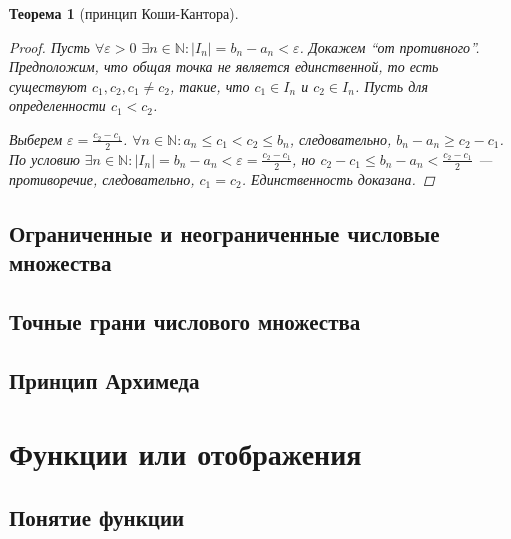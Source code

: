 \documentclass[a4paper,12pt]{article} %
\newtheorem{theorem}{Теорема}[section]
\theoremstyle{remark}
\theoremstyle{definition}
\begin{document}
\begin{theorem}[принцип Коши-Кантора]
\begin{proof}
Пусть $\forall \varepsilon > 0$ $\exists n \in  \mathbb{N} : |I_n| = b_n-a_n < \varepsilon$. Докажем ``от противного''. Предположим, что общая точка не является единственной, то есть существуют $c_1, c_2, c_1\neq c_2$, такие, что $c_1 \in  I_n$ и $c_2 \in  I_n$. Пусть для определенности $c_1<c_2$.

\begin{center}
\end{center}

Выберем $\varepsilon = \frac{c_2-c_1}{2}$. $\forall n\in \mathbb{N} : a_n \le  c_1 < c_2 \le b_n$, следовательно, $b_n - a_n \ge c_2-c_1$. По условию $\exists n \in  \mathbb{N} : |I_n| = b_n - a_n < \varepsilon = \frac{c_2-c_1}{2}$, но $c_2-c_1 \le b_n  - a_n < \frac{c_2-c_1}{2}$ --- противоречие, следовательно, $c_1=c_2$. Единственность доказана.
\end{proof}
\end{theorem}
\subsection{Ограниченные и неограниченные числовые множества}
\subsection{Точные грани числового множества}
\subsection{Принцип Архимеда}


\newpage
\section{Функции или отображения}
\subsection{Понятие функции}
\end{document}
